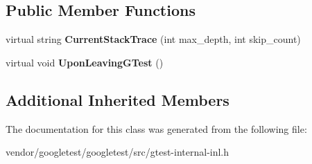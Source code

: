 \subsection*{Public Member Functions}
\begin{DoxyCompactItemize}
\item 
virtual string {\bfseries Current\+Stack\+Trace} (int max\+\_\+depth, int skip\+\_\+count)\hypertarget{classtesting_1_1internal_1_1OsStackTraceGetter_ac170c80bad1f1d18d4aceef72749e5da}{}\label{classtesting_1_1internal_1_1OsStackTraceGetter_ac170c80bad1f1d18d4aceef72749e5da}

\item 
virtual void {\bfseries Upon\+Leaving\+G\+Test} ()\hypertarget{classtesting_1_1internal_1_1OsStackTraceGetter_a9d36d9c580b2dcf4001adf1f4ea587ff}{}\label{classtesting_1_1internal_1_1OsStackTraceGetter_a9d36d9c580b2dcf4001adf1f4ea587ff}

\end{DoxyCompactItemize}
\subsection*{Additional Inherited Members}


The documentation for this class was generated from the following file\+:\begin{DoxyCompactItemize}
\item 
vendor/googletest/googletest/src/gtest-\/internal-\/inl.\+h\end{DoxyCompactItemize}
